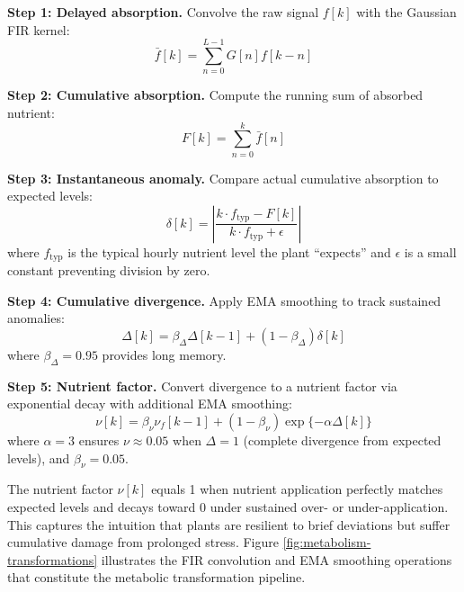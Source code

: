 \documentclass[pdflatex,sn-mathphys-num]{sn-jnl}
\newcommand{\df}[2]{\displaystyle\frac{#1}{#2}}
\begin{document}
\textbf{Step 1: Delayed absorption.} Convolve the raw signal $f[k]$ with the Gaussian FIR kernel:
\begin{equation}
\bar{f}[k] = \sum_{n=0}^{L-1} G[n]f[k-n]
\label{eqn:delayed-trans}
\end{equation}

\textbf{Step 2: Cumulative absorption.} Compute the running sum of absorbed nutrient:
\begin{equation}
F[k] = \sum_{n=0}^{k} \bar{f}[n]
\label{eqn:cum-trans}
\end{equation}

\textbf{Step 3: Instantaneous anomaly.} Compare actual cumulative absorption to expected levels:
\begin{equation}
\delta[k] = \left| \df{k \cdot f_{\text{typ}} - F[k]}{k \cdot f_{\text{typ}} + \epsilon} \right|
\label{eqn:anomaly-trans}
\end{equation}
where $f_{\text{typ}}$ is the typical hourly nutrient level the plant ``expects'' and $\epsilon$ is a small constant preventing division by zero.

\textbf{Step 4: Cumulative divergence.} Apply EMA smoothing to track sustained anomalies:
\begin{equation}
\Delta[k] = \beta_{\Delta} \Delta[k-1] + (1 - \beta_{\Delta}) \delta[k]
\label{eqn:cum-div-trans}
\end{equation}
where $\beta_{\Delta} = 0.95$ provides long memory.

\textbf{Step 5: Nutrient factor.} Convert divergence to a nutrient factor via exponential decay with additional EMA smoothing:
\begin{equation}
\nu[k] = \beta_{\nu} \nu_{f}[k-1] + (1 - \beta_{\nu}) \exp\{ -\alpha\Delta[k] \}
\label{eqn:nut-fac-trans}
\end{equation}
where $\alpha = 3$ ensures $\nu \approx 0.05$ when $\Delta = 1$ (complete divergence from expected levels), and $\beta_{\nu} = 0.05$.

The nutrient factor $\nu[k]$ equals 1 when nutrient application perfectly matches expected levels and decays toward 0 under sustained over- or under-application. This captures the intuition that plants are resilient to brief deviations but suffer cumulative damage from prolonged stress. Figure \ref{fig:metabolism-transformations} illustrates the FIR convolution and EMA smoothing operations that constitute the metabolic transformation pipeline.
\end{document}
